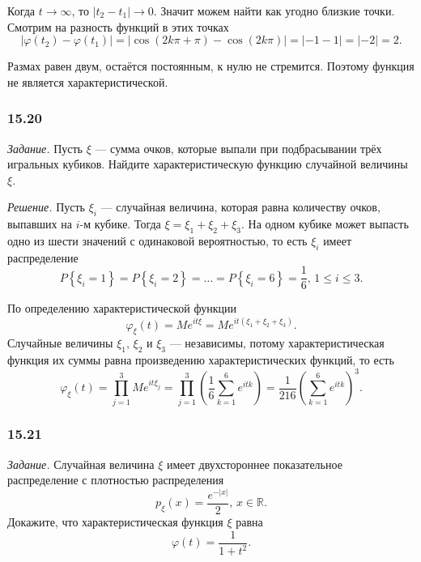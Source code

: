 \begin{enumerate}[label=\alph*)]
Когда $t \rightarrow \infty $, то $ \left| t_2 - t_1 \right| \rightarrow 0$.
Значит можем найти как угодно близкие точки.
Смотрим на разность функций в этих точках
$$ \left| \varphi \left( t_2 \right) - \varphi \left( t_1 \right) \right| =
\left| \cos \left( 2k \pi + \pi \right) - \cos \left( 2k \pi \right) \right| =
\left| - 1 - 1 \right| =
\left| - 2 \right| =
2.$$

Размах равен двум, остаётся постоянным, к нулю не стремится.
Поэтому функция не является характеристической.
\end{enumerate}

\subsubsection*{15.20}

\textit{Задание.} Пусть $ \xi $ --- сумма очков, которые выпали при подбрасывании трёх игральных кубиков.
Найдите характеристическую функцию случайной величины $ \xi $.

\textit{Решение.} Пусть $ \xi_i$ --- случайная величина, которая равна количеству очков, выпавших на $i$-м кубике.
Тогда $ \xi = \xi_1 + \xi_2 + \xi_3$.
На одном кубике может выпасть одно из шести значений с одинаковой вероятностью, то есть $ \xi_i$ имеет распределение
$$P \left\{ \xi_i = 1 \right\} =
P \left\{ \xi_i = 2 \right\} =
\dotsc =
P \left\{ \xi_i = 6 \right\} =
\frac{1}{6}, \,
1 \leq i \leq 3.$$

По определению характеристической функции
$$ \varphi_{ \xi } \left( t \right) =
Me^{it \xi} =
Me^{it \left( \xi_1 + \xi_2 + \xi_3 \right) }.$$
Случайные величины $ \xi_1, \, \xi_2$ и $ \xi_3$ --- независимы, потому характеристическая функция их суммы равна произведению характеристических функций, то есть
$$ \varphi_{ \xi } \left( t \right) =
\prod \limits_{j = 1}^3 Me^{it \xi_j} =
\prod \limits_{j = 1}^3 \left( \frac{1}{6} \sum \limits_{k = 1}^6 e^{itk} \right) =
\frac{1}{216} \left( \sum \limits_{k=1}^6 e^{itk} \right)^3.$$

\subsubsection*{15.21}

\textit{Задание.} Случайная величина $ \xi $ имеет двухстороннее показательное распределение с плотностью распределения
$$p_{ \xi } \left( x \right) =
\frac{e^{- \left| x \right| }}{2}, \,
x \in \mathbb{R}.$$
Докажите, что характеристическая функция $ \xi $ равна
$$ \varphi \left( t \right) =
\frac{1}{1 + t^2}.$$

